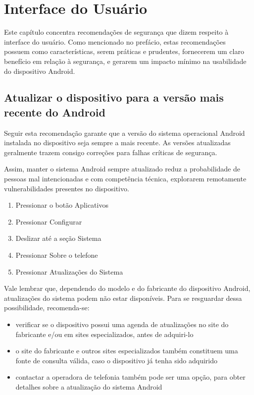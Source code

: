 \chapter{Interface do Usu\'ario}

Este cap\'itulo concentra recomenda\c c\~oes de seguran\c ca que dizem respeito \`a interface do usu\'ario. Como mencionado no pref\'acio, estas recomenda\c c\~oes possuem como caracter\'isticas, serem pr\'aticas e prudentes, fornecerem um claro benef\'icio em rela\c c\~ao \`a seguran\c ca, e gerarem um impacto m\'inimo na usabilidade do dispositivo Android.

\section{Atualizar o dispositivo para a vers\~ao mais recente do Android}

Seguir esta recomenda\c c\~ao garante que a vers\~ao do sistema operacional Android instalada no dispositivo seja sempre a mais recente. As vers\~oes atualizadas geralmente trazem consigo corre\c c\~oes para falhas cr\'iticas de seguran\c ca. 

Assim, manter o sistema Android sempre atualizado reduz a probabilidade de pessoas mal intencionadas e com compet\^encia t\'ecnica, explorarem remotamente vulnerabilidades presentes no dispositivo. 

\begin{enumerate}
\item Pressionar o bot\~ao Aplicativos
\item Pressionar Configurar
\item Deslizar at\'e a se\c c\~ao Sistema
\item Pressionar Sobre o telefone
\item Pressionar Atualiza\c c\~oes do Sistema
\end{enumerate}

Vale lembrar que, dependendo do modelo e do fabricante do dispositivo Android, atualiza\c c\~oes do sistema podem n\~ao estar dispon\'iveis. Para se resguardar dessa possibilidade, recomenda-se:

\begin{itemize} 
\item verificar se o dispositivo possui uma agenda de atualiza\c c\~oes no site do fabricante e/ou em sites especializados, antes de adquiri-lo
\item o site do fabricante e outros sites especializados tamb\'em constituem uma fonte de consulta v\'alida, caso o dispositivo j\'a tenha sido adquirido
\item contactar a operadora de telefonia tamb\'em pode ser uma op\c c\~ao, para obter detalhes sobre a atualiza\c c\~ao do sistema Android
\end{itemize} 

